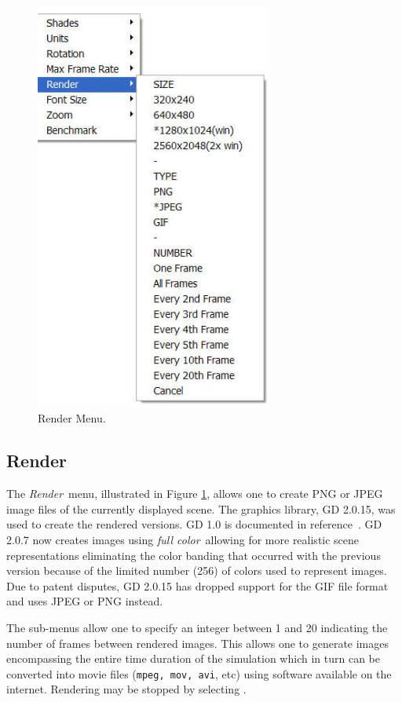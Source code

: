 \documentclass[11pt,twoside]{book}
\begin{document}
\begin{figure}[\figoptions]
\begin{center}
\includegraphics[width=3.0764in]{FIGURES/menu_render2}
\caption{Render Menu.} \label{fig_rendermenu}
\end{center}
\end{figure}

\subsection{Render}
The {\em Render}\ menu, illustrated in Figure
\ref{fig_rendermenu}, allows one to create PNG or JPEG image files
of the currently displayed scene. The graphics library, GD 2.0.15,
was used to create the rendered versions.  GD 1.0 is documented in
reference~\cite[Appendix 4]{BOUTELL}.  GD 2.0.7 now creates images
using {\em full color}\ allowing for more realistic scene
representations eliminating the color banding that occurred with
the previous version because of the limited number (256) of colors
used to represent images. Due to patent disputes, GD 2.0.15 has
dropped support for the GIF file format and uses JPEG or PNG
instead.

The  sub-menus allow one to specify an
integer between 1 and 20 indicating the number of frames
between rendered images. This allows one to generate images
encompassing the entire time duration of the simulation
which in turn can be converted into movie files ({\tt mpeg,
mov, avi}, etc) using software available on the internet.
Rendering may be stopped by selecting .
\end{document}
